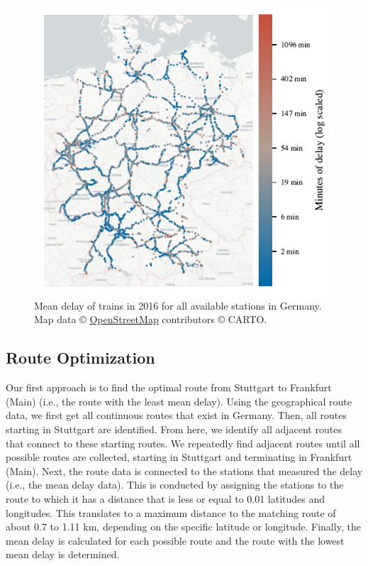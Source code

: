 \documentclass{article}
\theoremstyle{plain}
\theoremstyle{definition}
\theoremstyle{remark}
\begin{document}
\begin{figure} %
\begin{center}
\includegraphics{./fig/maps_KI_01_all_data_cmap.pdf} %
\end{center}
\caption{Mean delay of trains in 2016 for all available stations in Germany. Map data © \href{https://www.openstreetmap.org/}{OpenStreetMap} contributors © CARTO.}
\label{all_data_cmap}
\end{figure}

\subsection{Route Optimization}\label{sec:methods_route}

Our first approach is to find the optimal route from Stuttgart to Frankfurt (Main) (i.e., the route with the least mean delay). Using the geographical route data, we first get all continuous routes that exist in Germany. Then, all routes starting in Stuttgart are identified. From here, we identify all adjacent routes that connect to these starting routes. We repeatedly find adjacent routes until all possible routes are collected, starting in Stuttgart and terminating in Frankfurt (Main). Next, the route data is connected to the stations that measured the delay (i.e., the mean delay data). This is conducted by assigning the stations to the route to which it has a distance that is less or equal to 0.01 latitudes and longitudes. This translates to a maximum distance to the matching route of about 0.7 to 1.11 km, depending on the specific latitude or longitude. Finally, the mean delay is calculated for each possible route and the route with the lowest mean delay is determined.
\end{document}

